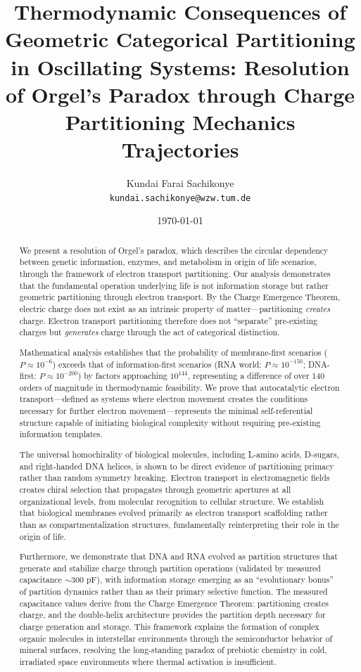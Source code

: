 \documentclass[12pt,a4paper]{article}
\title{\textbf{Thermodynamic Consequences of Geometric Categorical Partitioning in Oscillating Systems: Resolution of Orgel's Paradox through Charge Partitioning Mechanics Trajectories}}
\author{
Kundai Farai Sachikonye\\
\texttt{kundai.sachikonye@wzw.tum.de}
}
\date{\today}
\begin{document}
\maketitle

\begin{abstract}

We present a resolution of Orgel's paradox, which describes the circular dependency between genetic information, enzymes, and metabolism in origin of life scenarios, through the framework of electron transport partitioning. Our analysis demonstrates that the fundamental operation underlying life is not information storage but rather geometric partitioning through electron transport. By the Charge Emergence Theorem, electric charge does not exist as an intrinsic property of matter---partitioning \emph{creates} charge. Electron transport partitioning therefore does not ``separate'' pre-existing charges but \emph{generates} charge through the act of categorical distinction.

Mathematical analysis establishes that the probability of membrane-first scenarios ($P \approx 10^{-6}$) exceeds that of information-first scenarios (RNA world: $P \approx 10^{-150}$; DNA-first: $P \approx 10^{-200}$) by factors approaching $10^{144}$, representing a difference of over 140 orders of magnitude in thermodynamic feasibility. We prove that autocatalytic electron transport—defined as systems where electron movement creates the conditions necessary for further electron movement—represents the minimal self-referential structure capable of initiating biological complexity without requiring pre-existing information templates.

The universal homochirality of biological molecules, including L-amino acids, D-sugars, and right-handed DNA helices, is shown to be direct evidence of partitioning primacy rather than random symmetry breaking. Electron transport in electromagnetic fields creates chiral selection that propagates through geometric apertures at all organizational levels, from molecular recognition to cellular structure. We establish that biological membranes evolved primarily as electron transport scaffolding rather than as compartmentalization structures, fundamentally reinterpreting their role in the origin of life.

Furthermore, we demonstrate that DNA and RNA evolved as partition structures that generate and stabilize charge through partition operations (validated by measured capacitance $\sim 300$ pF), with information storage emerging as an ``evolutionary bonus'' of partition dynamics rather than as their primary selective function. The measured capacitance values derive from the Charge Emergence Theorem: partitioning creates charge, and the double-helix architecture provides the partition depth necessary for charge generation and storage. This framework explains the formation of complex organic molecules in interstellar environments through the semiconductor behavior of mineral surfaces, resolving the long-standing paradox of prebiotic chemistry in cold, irradiated space environments where thermal activation is insufficient.


\end{abstract}
\end{document}

